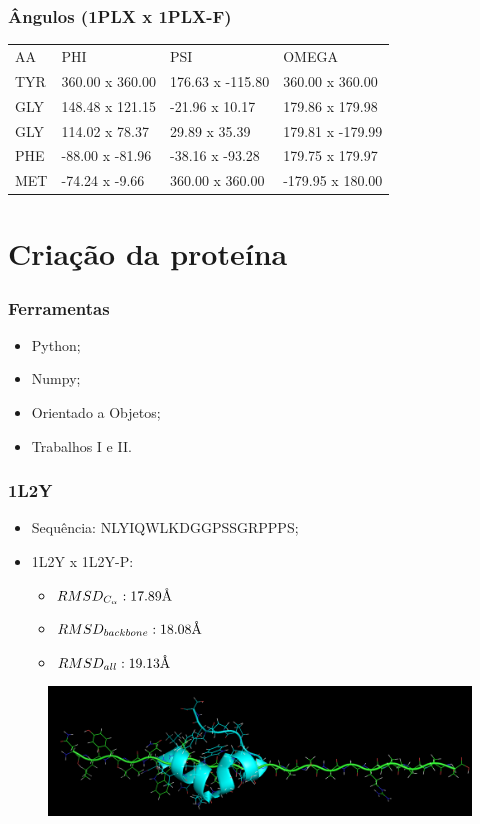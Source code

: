 \documentclass{beamer}
\newcommand{\angstrom}{\textup{\AA}}
\begin{document}
\begin{frame}
\frametitle{Ângulos (1PLX x 1PLX-F)}
\begin{table}[]
\centering
\label{my-label}
\begin{tabular}{llll}
AA & PHI             &  PSI              &  OMEGA             \\
TYR         & 360.00 x 360.00 &  176.63 x -115.80 &  360.00 x  360.00  \\
GLY         & 148.48 x 121.15 &  -21.96 x   10.17 &  179.86 x  179.98  \\
GLY         & 114.02 x  78.37 &   29.89 x   35.39 &  179.81 x -179.99  \\
PHE         & -88.00 x -81.96 &  -38.16 x  -93.28 &  179.75 x  179.97  \\
MET         & -74.24 x  -9.66 &  360.00 x  360.00 & -179.95 x  180.00
\end{tabular}
\end{table}
\end{frame}

\section{Criação da proteína} %

\begin{frame}
\frametitle{Ferramentas}
\begin{itemize}
\item Python;
\item Numpy;
\item Orientado a Objetos;
\item Trabalhos I e II.
\end{itemize}
\end{frame}

\begin{frame}
\frametitle{1L2Y}
\begin{itemize}
\item Sequência: NLYIQWLKDGGPSSGRPPPS;
\item 1L2Y x 1L2Y-P:
\begin{itemize}
  \item $RMSD_{C_\alpha}: 17.89 \angstrom$
  \item $RMSD_{backbone}: 18.08 \angstrom$
  \item $RMSD_{all}: 19.13 \angstrom$ 
\end{itemize}
\end{itemize}
\begin{figure}
\includegraphics[width=0.7\linewidth]{1L2Y.png}
\end{figure}
\end{frame}
\end{document}
